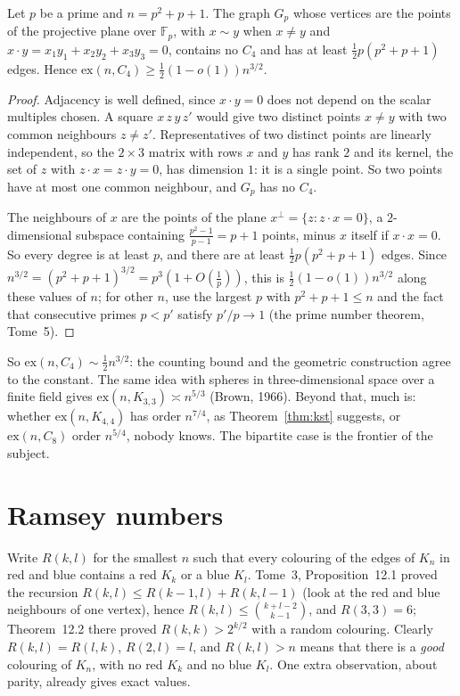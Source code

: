 \begin{theorem}\label{thm:polarity}
Let $p$ be a prime and $n=p^2+p+1$. The graph $G_p$ whose vertices are the points of the projective plane over $\mathbb F_p$, with $x\sim y$ when $x\ne y$ and
$x\cdot y=x_1y_1+x_2y_2+x_3y_3=0$, contains no $C_4$ and has at least $\frac12p(p^2+p+1)$ edges. Hence $\mathrm{ex}(n,C_4)\ge\frac12(1-o(1))n^{3/2}$.
\end{theorem}
\begin{proof}
Adjacency is well defined, since $x\cdot y=0$ does not depend on the scalar multiples chosen. A square $x\,z\,y\,z'$ would give two distinct points
$x\neq y$ with two common neighbours $z\ne z'$. Representatives of two distinct points are linearly independent, so the $2\times3$ matrix with rows $x$
and $y$ has rank $2$ and its kernel, the set of $z$ with $z\cdot x=z\cdot y=0$, has dimension $1$: it is a single point. So two points have at most one common
neighbour, and $G_p$ has no $C_4$.

The neighbours of $x$ are the points of the plane $x^\perp=\{z:z\cdot x=0\}$, a $2$-dimensional subspace containing $\frac{p^2-1}{p-1}=p+1$ points, minus $x$
itself if $x\cdot x=0$. So every degree is at least $p$, and there are at least $\frac12p(p^2+p+1)$ edges. Since $n^{3/2}=(p^2+p+1)^{3/2}=p^3(1+O(\frac1p))$, this is
$\frac12(1-o(1))n^{3/2}$ along these values of $n$; for other $n$, use the largest $p$ with $p^2+p+1\le n$ and the fact that consecutive primes $p<p'$ satisfy
$p'/p\to1$ (the prime number theorem, Tome~5).
\end{proof}

So $\mathrm{ex}(n,C_4)\sim\frac12n^{3/2}$: the counting bound and the geometric construction agree to the constant. The same idea with spheres in
three-dimensional space over a finite field gives $\mathrm{ex}(n,K_{3,3})\asymp n^{5/3}$ (Brown, 1966). Beyond that, much is: whether $\mathrm{ex}(n,K_{4,4})$ has order $n^{7/4}$, as Theorem~\ref{thm:kst} suggests, or $\mathrm{ex}(n,C_8)$ order $n^{5/4}$, nobody knows. The bipartite
case is the frontier of the subject.

\section{Ramsey numbers}

Write $R(k,l)$ for the smallest $n$ such that every colouring of the edges of $K_n$ in red and blue contains a red $K_k$ or a blue $K_l$. Tome~3, Proposition~12.1
proved the recursion $R(k,l)\le R(k-1,l)+R(k,l-1)$ (look at the red and blue neighbours of one vertex), hence $R(k,l)\le\binom{k+l-2}{k-1}$, and $R(3,3)=6$; Theorem~12.2 there
proved $R(k,k)>2^{k/2}$ with a random colouring. Clearly $R(k,l)=R(l,k)$, $R(2,l)=l$, and $R(k,l)>n$ means that there is a \emph{good} colouring of $K_n$, with no red
$K_k$ and no blue $K_l$. One extra observation, about parity, already gives exact values.

